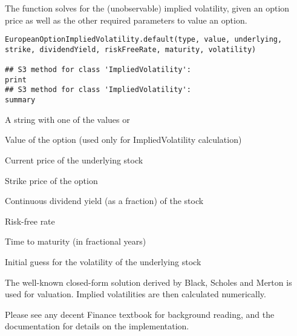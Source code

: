 \begin{Description}\relax
The  function solves for the
(unobservable) implied volatility, given an option price as well as
the other required parameters to value an option.
\end{Description}
\begin{Usage}
\begin{verbatim}
EuropeanOptionImpliedVolatility.default(type, value, underlying, strike, dividendYield, riskFreeRate, maturity, volatility)

## S3 method for class 'ImpliedVolatility':
print
## S3 method for class 'ImpliedVolatility':
summary
\end{verbatim}
\end{Usage}
\begin{Arguments}
\begin{ldescription}
\item[\code{type}] A string with one of the values  or 
\item[\code{value}] Value of the option (used only for ImpliedVolatility calculation)
\item[\code{underlying}] Current price of the underlying stock
\item[\code{strike}] Strike price of the option
\item[\code{dividendYield}] Continuous dividend yield (as a fraction) of the stock
\item[\code{riskFreeRate}] Risk-free rate
\item[\code{maturity}] Time to maturity (in fractional years)
\item[\code{volatility}] Initial guess for the volatility of the underlying stock
\end{ldescription}
\end{Arguments}
\begin{Details}\relax
The well-known closed-form solution derived by Black, Scholes and
Merton is used for valuation. Implied volatilities are then calculated
numerically.

Please see any decent Finance textbook for background reading, and the
 documentation for details on the 
implementation.
\end{Details}

